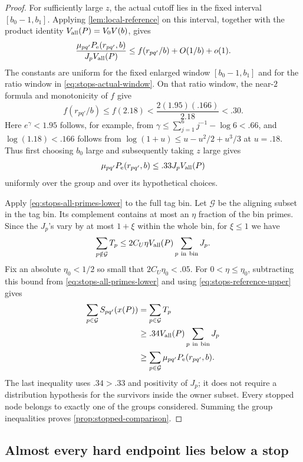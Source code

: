 \begin{proof}
For sufficiently large $z$, the actual cutoff lies in the fixed
interval $[b_0-1,b_1]$.
Applying \cref{lem:local-reference} on this interval, together with the
product identity $V_{\rm all}(P)=V_0V(b)$, gives
\[
 \frac{\mu_{pq'}P_\mathrm e(r_{pq'},b)}{J_pV_{\rm all}(P)}
 \le f(r_{pq'}/b)+O(1/b)+o(1).
\]
The constants are uniform for the fixed enlarged window $[b_0-1,b_1]$ and for
the ratio window in \eqref{eq:stops-actual-window}.  On that ratio
window, the near-$2$ formula and monotonicity of $f$ give
\[
 f(r_{pq'}/b)\le f(2.18)
 <\frac{2(1.95)(.166)}{2.18}<.30.
\]
Here $e^\gamma<1.95$ follows, for example, from
$\gamma\le\sum_{j=1}^6j^{-1}-\log6<.66$, and
$\log(1.18)<.166$ follows from
$\log(1+u)\le u-u^2/2+u^3/3$ at $u=.18$.
Thus first choosing $b_0$ large and subsequently taking $z$ large gives
\begin{equation}\label{eq:stops-reference-upper}
 \mu_{pq'}P_\mathrm e(r_{pq'},b)\le .33 J_pV_{\rm all}(P)
\end{equation}
uniformly over the group and over its hypothetical choices.

Apply \eqref{eq:stops-all-primes-lower} to the full tag bin.
Let $\mathcal G$ be the aligning subset in the tag bin.  Its complement
contains at most an $\eta$ fraction of the bin primes.  Since the
$J_p$'s vary by at most $1+\xi$ within the whole bin, for $\xi\le1$
we have
\[
 \sum_{p\notin\mathcal G}T_p
 \le 2C_U\eta V_{\rm all}(P)
                    \sum_{p\ \mathrm{in\ bin}}J_p.
\]
Fix an absolute $\eta_0<1/2$ so small that
$2C_U\eta_0<.05$.  For $0<\eta\le\eta_0$, subtracting this bound
from \eqref{eq:stops-all-primes-lower} and using
\eqref{eq:stops-reference-upper} gives
\[
 \begin{split}
 \sum_{p\in\mathcal G}S_{pq'}(x(P))
 &=\sum_{p\in\mathcal G}T_p\\
 &\ge .34V_{\rm all}(P)\sum_{p\ \mathrm{in\ bin}}J_p\\
 &\ge\sum_{p\in\mathcal G}\mu_{pq'}P_\mathrm e(r_{pq'},b).
 \end{split}
\]
The last inequality uses $.34>.33$ and positivity of $J_p$; it does
not require a distribution hypothesis for the survivors inside the
owner subset.  Every stopped node belongs to exactly one of the
groups considered.  Summing the group inequalities proves
\cref{prop:stopped-comparison}.

\end{proof}

\subsection{Almost every hard endpoint lies below a stop}

